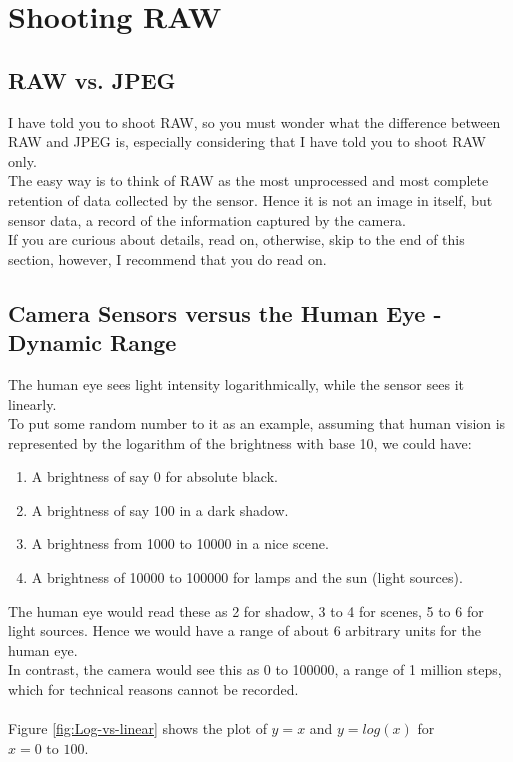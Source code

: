 \section{Shooting RAW}
\label{sec:shooting-RAW}

\subsection{RAW vs. JPEG}

I have told you to shoot \gls{RAW}, so you must wonder what the difference between \gls{RAW} and \gls{JPEG} is, especially considering that I have told you to shoot \gls{RAW} only.
\\
The easy way is to think of \gls{RAW} as the most unprocessed and most complete retention of data collected by the \gls{sensor}. Hence it is not an image in itself, but sensor data, a record of the information captured by the camera.
\\
If you are curious about details, read on, otherwise, skip to the end of this section, however, I recommend that you do read on.


\subsection{Camera Sensors versus the Human Eye - Dynamic Range}
\label{subsec:Camera-Sensor-Human-Eye}

The human eye sees light intensity logarithmically, while the \gls{sensor} sees it linearly.
\\
To put some random number to it as an example, assuming that human vision is represented by the logarithm of the brightness with base 10, we could have:

\begin{enumerate}
	\item A brightness of say 0 for absolute black.
	\item A brightness of say 100 in a dark shadow.
	\item A brightness from 1000 to 10000 in a nice scene.
	\item A brightness of 10000 to 100000 for lamps and the sun (light sources).
\end{enumerate}

The human eye would read these as 2 for shadow, 3 to 4 for scenes, 5 to 6 for light sources. Hence we would have a range of about 6 arbitrary units for the human eye.
\\
In contrast, the camera would see this as 0 to 100000, a range of 1 million steps, which for technical reasons cannot be recorded.
\\
\\
Figure \ref{fig:Log-vs-linear} shows the plot of $y=x$ and $y=log(x)$ for $x=0 \mbox{ to }100$. 

